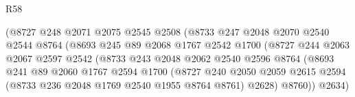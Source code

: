 \begin{lexlean}{R58}
\begin{coremodule}
                                      (@8727
                                        @248
                                        @2071
                                        @2075
                                        @2545
                                        @2508
                                        (@8733
                                          @247
                                          @2048
                                          @2070
                                          @2540
                                          @2544
                                          @8764
                                          (@8693
                                            @245
                                            @89
                                            @2068
                                            @1767
                                            @2542
                                            @1700
                                            (@8727
                                              @244
                                              @2063
                                              @2067
                                              @2597
                                              @2542
                                              (@8733
                                                @243
                                                @2048
                                                @2062
                                                @2540
                                                @2596
                                                @8764
                                                (@8693
                                                  @241
                                                  @89
                                                  @2060
                                                  @1767
                                                  @2594
                                                  @1700
                                                  (@8727
                                                    @240
                                                    @2050
                                                    @2059
                                                    @2615
                                                    @2594
                                                    (@8733 @236 @2048 @1769 @2540 @1955 @8764 @8761)
                                                    @2628)
                                                  @8760))
                                              @2634)

\end{coremodule}
\end{lexlean}
